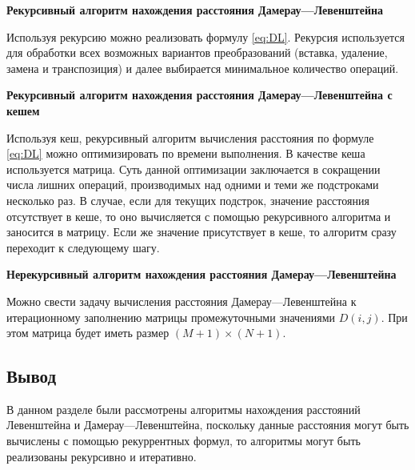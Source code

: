 \newpage

\textbf{Рекурсивный алгоритм нахождения расстояния Дамерау---Левенштейна}

Используя рекурсию можно реализовать формулу \eqref{eq:DL}. Рекурсия используется для обработки всех возможных вариантов преобразований (вставка, удаление, замена и транспозиция) и далее выбирается минимальное количество операций.

\textbf{Рекурсивный алгоритм нахождения расстояния Дамерау---Левенштейна с кешем}

Используя кеш, рекурсивный алгоритм вычисления расстояния по формуле \eqref{eq:DL} можно оптимизировать по времени выполнения.  В качестве кеша используется матрица. Суть данной оптимизации заключается в сокращении числа лишних операций, производимых над одними и теми же подстроками несколько раз. В случае, если для текущих подстрок, значение расстояния отсутствует в кеше, то оно вычисляется с помощью рекурсивного алгоритма и заносится в матрицу. Если же значение присутствует в кеше, то алгоритм сразу переходит к следующему шагу.

\textbf{Нерекурсивный алгоритм нахождения расстояния Дамерау---Левенштейна}

Можно свести задачу вычисления расстояния Дамерау---Левенштейна к итерационному заполнению матрицы промежуточными значениями $D(i, j)$. При этом матрица будет иметь размер $(M+1) \times (N+1)$.

\subsection*{Вывод}
В данном разделе были рассмотрены алгоритмы нахождения расстояний Левенштейна и Дамерау---Левенштейна, поскольку данные расстояния могут быть вычислены с помощью рекуррентных формул, то алгоритмы могут быть реализованы рекурсивно и итеративно. 


